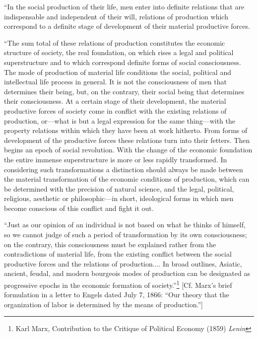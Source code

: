 \documentclass[a4paper,12pt]{book}
\begin{document}
\begin{center}
\footnotesize{ “In the social production of their life, men enter into definite relations that are indispensable and independent of their will, relations of production which correspond to a definite stage of development of their material productive forces.

“The sum total of these relations of production constitutes the economic structure of society, the real foundation, on which rises a legal and political superstructure and to which correspond definite forms of social consciousness. The mode of production of material life conditions the social, political and intellectual life process in general. It is not the consciousness of men that determines their being, but, on the contrary, their social being that determines their consciousness. At a certain stage of their development, the material productive forces of society come in conflict with the existing relations of production, or—what is but a legal expression for the same thing—with the property relations within which they have been at work hitherto. From forms of development of the productive forces these relations turn into their fetters. Then begins an epoch of social revolution. With the change of the economic foundation the entire immense superstructure is more or less rapidly transformed. In considering such transformations a distinction should always be made between the material transformation of the economic conditions of production, which can be determined with the precision of natural science, and the legal, political, religious, aesthetic or philosophic—in short, ideological forms in which men become conscious of this conflict and fight it out.

“Just as our opinion of an individual is not based on what he thinks of himself, so we cannot judge of such a period of transformation by its own consciousness; on the contrary, this consciousness must be explained rather from the contradictions of material life, from the existing conflict between the social productive forces and the relations of production.... In broad outlines, Asiatic, ancient, feudal, and modern bourgeois modes of production can be designated as progressive epochs in the economic formation of society.”\footnote{Karl Marx, Contribution to the Critique of Political Economy (1859) \emph{Lenin}} [Cf. Marx’s brief formulation in a letter to Engels dated July 7, 1866: “Our theory that the organization of labor is determined by the means of production.”]}
\end{center}
\end{document}
